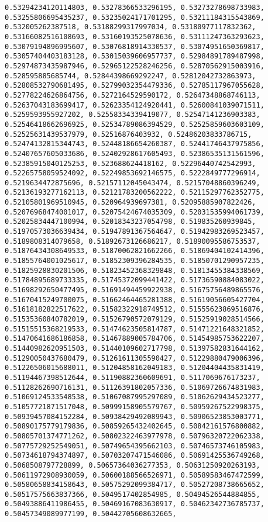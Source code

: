 \documentclass[11pt]{article}
\begin{document}
\begin{Verbatim}[commandchars=\\\{\}]
0.53294234120114803, 0.53278366533296195, 0.53273278698733983, 0.53255806695435237, 0.53235024171701295, 0.53211184315543869, 0.532005262387518, 0.53188299317997034, 0.53180977117832362, 0.53166082516108693, 0.53160193525078636, 0.53111247363293623, 0.53079194896995607, 0.53076818914330537, 0.53074951650369817, 0.53057404403183128, 0.53015039606957737, 0.52984891789487998, 0.52974873435987946, 0.52965122528246256, 0.52870562915003916, 0.528595885685744, 0.52844398669292247, 0.52812042732863973, 0.52808532790681495, 0.52799032354479336, 0.52785117967055628, 0.52778224626864756, 0.5272164529590172, 0.52647348868746113, 0.52637043183699417, 0.52623354124920441, 0.52600841039071511, 0.5259593955927202, 0.52558334339419077, 0.52547141236903383, 0.52546418662696925, 0.52534789086394529, 0.52525859603603109, 0.52525631439537979, 0.52516876403932, 0.52486203833786715, 0.52474132815344743, 0.52448186654260387, 0.52441746437975856, 0.52407657605033686, 0.52402928617605493, 0.52386535131561596, 0.52385915040125253, 0.523688624418162, 0.52296440742542993, 0.52265758059524092, 0.52249853692146575, 0.5222849777296914, 0.5219634472875696, 0.52157112045043474, 0.52157048860396249, 0.52136193277162113, 0.52121783200562222, 0.52115297762352775, 0.52105801969510945, 0.520964939697381, 0.52095885907822426, 0.52076968474001017, 0.52075424674035309, 0.52031535994061739, 0.52025834447100994, 0.52018343237054798, 0.519835260939845, 0.51970573036639434, 0.51947891367564647, 0.51942983269523457, 0.5189808314079658, 0.51892673126686217, 0.51890095586753537, 0.51876434308649533, 0.51870062821662266, 0.51869404102414396, 0.51855764001025617, 0.51852309396284535, 0.51850701290957235, 0.51825928830201506, 0.51823452368329848, 0.51813455384338569, 0.51784895689733335, 0.51745372099441422, 0.51736590884083022, 0.51698292650477495, 0.51691494459922938, 0.51675756489865576, 0.51670415249700075, 0.51662464465281388, 0.51619056605427704, 0.51618182822517622, 0.51582322918749512, 0.51555623869516876, 0.51535360840782019, 0.51526790572079129, 0.51525919028514566, 0.51515515368219533, 0.51474623505814787, 0.51471221648321852, 0.51470641686186858, 0.51467889005784706, 0.51454985753622207, 0.51440982620951503, 0.51440109602717798, 0.51397582831644162, 0.51290050437680479, 0.51261611305590427, 0.51229880479006396, 0.51226506015688011, 0.51204858162049183, 0.51204404435831419, 0.51194467398512644, 0.51190882360609691, 0.5117069676173237, 0.51128262690716131, 0.51126391802057336, 0.51069726674831983, 0.51069124533548538, 0.51067087995297089, 0.51062629434523277, 0.51057721871517048, 0.50999158905579767, 0.50959267522998375, 0.50939457084152284, 0.50938429492089943, 0.50906523853003771, 0.50890175779179836, 0.50859265432402645, 0.50842161576800882, 0.50805701374771262, 0.50802322463977978, 0.50796320722062338, 0.50775729252549051, 0.50749654395662103, 0.50746573746105983, 0.50734618794374897, 0.50703207471546086, 0.50691425536749268, 0.5068508797728899, 0.50657364036277353, 0.50631250920263193, 0.50611972908930059, 0.50600188566526971, 0.50589583467472599, 0.50580658834158643, 0.50575292099384717, 0.50527208738665652, 0.50517575663837366, 0.5049517402854985, 0.50494526544884855, 0.50493886411986455, 0.50469167083630917, 0.50462342736785737, 0.50457349089977199, 0.50442705608632665, 
\end{Verbatim}
\end{document}
